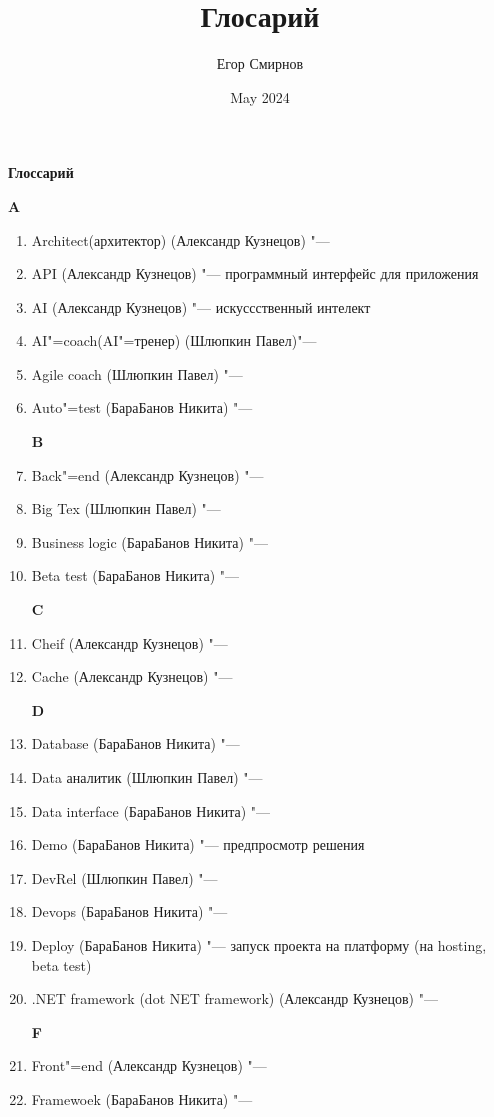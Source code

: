 \documentclass{article}
\title{Глосарий}
\author{Егор Смирнов}
\date{May 2024}
\begin{document}
\begin{center}
    \textbf{Глоссарий}
\end{center}
\textbf{A} 
\begin{enumerate}
    \item {Architect(архитектор) (Александр Кузнецов) "---}
    \item {API (Александр Кузнецов) "--- программный интерфейс для приложения}
    \item {AI (Александр Кузнецов) "--- искуссственный интелект}
    \item {AI"=coach(AI"=тренер) (Шлюпкин Павел)"---}
    \item {Agile coach (Шлюпкин Павел) "---}
    \item {Auto"=test (БараБанов Никита) "---}
    
    \textbf{B}
    \item {Back"=end (Александр Кузнецов) "---} 
    \item {Big Tex (Шлюпкин Павел) "---}
    \item {Business logic (БараБанов Никита) "---}
    \item {Beta test (БараБанов Никита) "---}
    
    
    \textbf{C}
    \item {Cheif (Александр Кузнецов) "---}
    \item {Cache (Александр Кузнецов) "---}
    
    \textbf{D}
    \item {Database (БараБанов Никита) "---}
    \item {Data аналитик (Шлюпкин Павел) "--- }
    \item {Data interface (БараБанов Никита) "---}
    \item {Demo (БараБанов Никита) "--- предпросмотр решения}
    \item {DevRel (Шлюпкин Павел) "---}
    \item {Devops (БараБанов Никита) "---}
    \item {Deploy (БараБанов Никита) "--- запуск проекта на платформу (на hosting, beta test)}
    \item{.NET framework (dot NET framework) (Александр Кузнецов) "---}
    

    \textbf{F}
    \item {Front"=end (Александр Кузнецов) "---}
    \item {Framewoek (БараБанов Никита) "---}


\end{enumerate}
\end{document}
